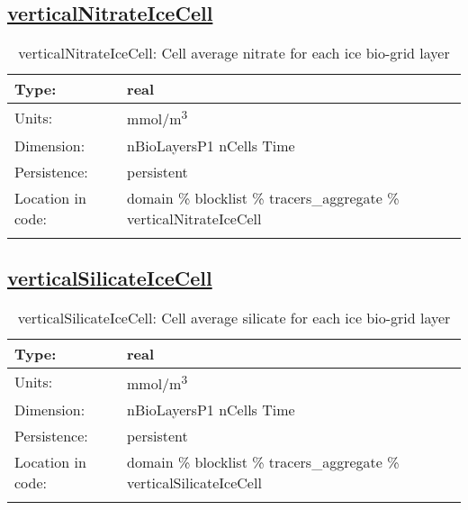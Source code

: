 \subsection[verticalNitrateIceCell]{\hyperref[sec:var_tab_tracers_aggregate]{verticalNitrateIceCell}}
\label{subsec:var_sec_tracers_aggregate_verticalNitrateIceCell}
\begin{center}
\begin{longtable}{| p{2.0in} | p{4.0in} |}
        \hline 
        Type: & real \\
        \hline 
        Units: & \si{mmol/m^3} \\
        \hline 
        Dimension: & nBioLayersP1 nCells Time \\
        \hline 
        Persistence: & persistent \\
        \hline 
         Location in code: & domain \% blocklist \% tracers\_aggregate \% verticalNitrateIceCell \\
         \hline 
    \caption{verticalNitrateIceCell: Cell average nitrate for each ice bio-grid layer}
\end{longtable}
\end{center}
\subsection[verticalSilicateIceCell]{\hyperref[sec:var_tab_tracers_aggregate]{verticalSilicateIceCell}}
\label{subsec:var_sec_tracers_aggregate_verticalSilicateIceCell}
\begin{center}
\begin{longtable}{| p{2.0in} | p{4.0in} |}
        \hline 
        Type: & real \\
        \hline 
        Units: & \si{mmol/m^3} \\
        \hline 
        Dimension: & nBioLayersP1 nCells Time \\
        \hline 
        Persistence: & persistent \\
        \hline 
         Location in code: & domain \% blocklist \% tracers\_aggregate \% verticalSilicateIceCell \\
         \hline 
    \caption{verticalSilicateIceCell: Cell average silicate for each ice bio-grid layer}
\end{longtable}
\end{center}

